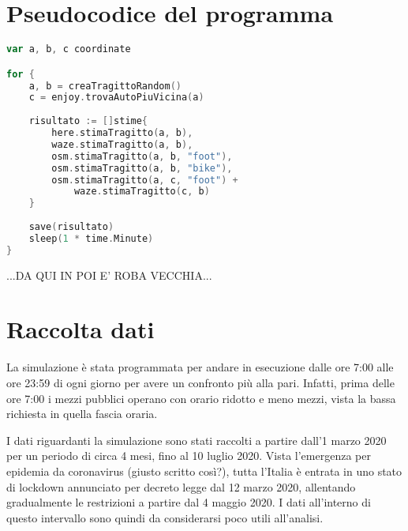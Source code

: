 \section{Pseudocodice del programma}

\begin{lstlisting}[language=Go]
var a, b, c coordinate

for {
	a, b = creaTragittoRandom()
	c = enjoy.trovaAutoPiuVicina(a)
	
	risultato := []stime{
		here.stimaTragitto(a, b),
		waze.stimaTragitto(a, b),
		osm.stimaTragitto(a, b, "foot"),
		osm.stimaTragitto(a, b, "bike"),
		osm.stimaTragitto(a, c, "foot") +
			waze.stimaTragitto(c, b)
	}
	
	save(risultato)
	sleep(1 * time.Minute)
}
\end{lstlisting}

...DA QUI IN POI E' ROBA VECCHIA...

\section{Raccolta dati}

La simulazione è stata programmata per andare in esecuzione dalle ore 7:00 alle ore 23:59 di ogni giorno per avere un confronto più alla pari. Infatti, prima delle ore 7:00 i mezzi pubblici operano con orario ridotto e meno mezzi, vista la bassa richiesta in quella fascia oraria.

I dati riguardanti la simulazione sono stati raccolti a partire dall'1 marzo 2020 per un periodo di circa 4 mesi, fino al 10 luglio 2020. Vista l'emergenza per epidemia da coronavirus (giusto scritto così?), tutta l'Italia è entrata in uno stato di lockdown annunciato per decreto legge dal 12 marzo 2020, allentando gradualmente le restrizioni a partire dal 4 maggio 2020. I dati all'interno di questo intervallo sono quindi da considerarsi poco utili all'analisi.

